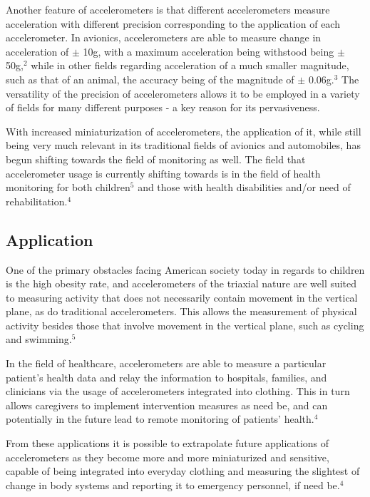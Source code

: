 \documentclass[titlepage]{article}
\begin{document}
Another feature of accelerometers is that different accelerometers measure acceleration with different precision corresponding to the application of each accelerometer. In avionics, accelerometers are able to measure change in acceleration of $\pm$ 10g, with a maximum acceleration being withstood being  $\pm$ 50g,$^2$ while in other fields regarding acceleration of a much smaller magnitude, such as that of an animal, the accuracy being of the magnitude of $\pm$ 0.06g.$^3$ The versatility of the precision of accelerometers allows it to be employed in a variety of fields for many different purposes - a key reason for its pervasiveness.

With increased miniaturization of accelerometers, the application of it, while still being very much relevant in its traditional fields of avionics and automobiles, has begun shifting towards the field of monitoring as well.
The field that accelerometer usage is currently shifting towards is in the field of health monitoring for both children$^5$ and those with health disabilities and/or need of rehabilitation.$^4$ 

\pagebreak

\subsection*{Application}

One of the primary obstacles facing American society today in regards to children is the high obesity rate, and accelerometers of the triaxial nature are well suited to measuring activity that does not necessarily contain movement in the vertical plane, as do traditional accelerometers. This allows the measurement of physical activity besides those that involve movement in the vertical plane, such as cycling and swimming.$^5$

In the field of healthcare, accelerometers are able to measure a particular patient's health data and relay the information to hospitals, families, and clinicians via the usage of accelerometers integrated into clothing. This in turn allows caregivers to implement intervention measures as need be, and can potentially in the future lead to remote monitoring of patients' health.$^4$ 

From these applications it is possible to extrapolate future applications of accelerometers as they become more and more miniaturized and sensitive, capable of being integrated into everyday clothing and measuring the slightest of change in body systems and reporting it to emergency personnel, if need be.$^4$
\end{document}
